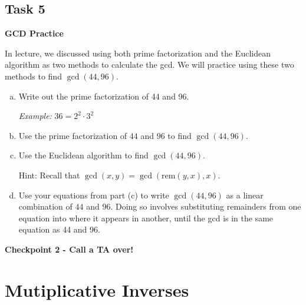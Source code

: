 \documentclass[12pt,letterpaper]{article}
\begin{document}
    \pagebreak
    \subsection*{Task 5}
    \textbf{GCD Practice}
    
    In lecture, we discussed using both prime factorization and the Euclidean algorithm as two methods to calculate the gcd. We will practice using these two methods to find $\gcd(44, 96)$.
    
    \begin{enumerate}[a.]
    \item Write out the prime factorization of 44 and 96.
    
    \textit{Example:} $36 = 2^2 \cdot 3^2$
    \begin{mdframed} \vspace{1cm} \end{mdframed}
    
    \item Use the prime factorization of $44$ and $96$ to find $\gcd(44, 96)$.
    \begin{mdframed} \vspace{1cm} \end{mdframed}
    
    \item Use the Euclidean algorithm to find $\gcd(44, 96)$.
    
    Hint: Recall that $\gcd(x, y) = \gcd(\text{rem}(y, x), x)$.
    
    \begin{mdframed} \vspace{2cm} \end{mdframed}
    
    \item Use your equations from part (c) to write $\gcd(44, 96)$ as a linear combination of $44$ and $96$. Doing so involves substituting remainders from one equation into where it appears in another, until the gcd is in the same equation as 44 and 96.
    
    \begin{mdframed} \vspace{2cm} \end{mdframed}
    \end{enumerate}
    
    \textbf{Checkpoint 2 - Call a TA over!}
    
    \pagebreak
	\section*{Mutiplicative Inverses}
\end{document}
